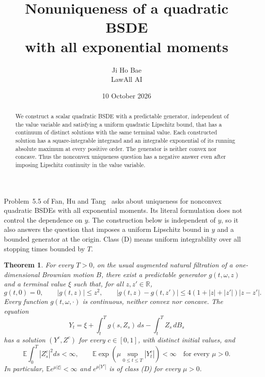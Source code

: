 \documentclass[11pt]{article}
\title{Nonuniqueness of a quadratic BSDE\protect\\ with all exponential moments}
\author{Ji Ho Bae\\\small LawAll AI}
\date{10 October 2026}
\newtheorem{theorem}{Theorem}
\newcommand{\E}{\mathbb E}
\begin{document}
\maketitle
\begin{abstract}
We construct a scalar quadratic BSDE with a predictable generator, independent of the value variable and satisfying a uniform quadratic Lipschitz bound, that has a continuum of distinct solutions with the same terminal value. Each constructed solution has a square-integrable integrand and an integrable exponential of its running absolute maximum at every positive order. The generator is neither convex nor concave. Thus the nonconvex uniqueness question has a negative answer even after imposing Lipschitz continuity in the value variable.
\end{abstract}

Problem~5.5 of Fan, Hu and Tang~\cite{FHT} asks about uniqueness for nonconvex quadratic BSDEs with all exponential moments. Its literal formulation does not control the dependence on $y$. The construction below is independent of $y$, so it also answers the question that imposes a uniform Lipschitz bound in $y$ and a bounded generator at the origin. Class (D) means uniform integrability over all stopping times bounded by $T$.

\begin{theorem}\label{main}
For every $T>0$, on the usual augmented natural filtration of a one-dimensional Brownian motion $B$, there exist a predictable generator $g(t,\omega,z)$ and a terminal value $\xi$ such that, for all $z,z'\in\mathbb R$,
\begin{equation}\label{bounds}
 g(t,0)=0,\qquad |g(t,z)|\leq z^2,\qquad
 |g(t,z)-g(t,z')|\leq4(1+|z|+|z'|)|z-z'|.
\end{equation}
Every function $g(t,\omega,\cdot)$ is continuous, neither convex nor concave. The equation
\begin{equation}\label{bsde}
 Y_t=\xi+\int_t^T g(s,Z_s)\,ds-\int_t^T Z_s\,dB_s
\end{equation}
has a solution $(Y^c,Z^c)$ for every $c\in[0,1]$, with distinct initial values, and
\begin{equation}\label{moments}
 \E\int_0^T|Z^c_s|^2ds<\infty,\qquad
 \E\exp\!\left(\mu\sup_{0\leq t\leq T}|Y^c_t|\right)<\infty
 \quad\text{for every }\mu>0.
\end{equation}
In particular, $\E e^{\mu|\xi|}<\infty$ and $e^{\mu|Y^c|}$ is of class (D) for every $\mu>0$.
\end{theorem}
\end{document}
